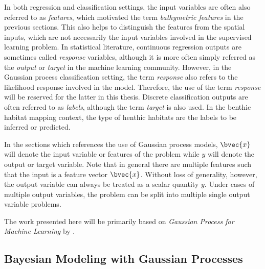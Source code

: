 		In both regression and classification settings, the input variables are often also referred to as \textit{features}, which motivated the term \textit{bathymetric features} in the previous sections. This also helps to distinguish the features from the spatial inputs, which are not necessarily the input variables involved in the supervised learning problem. In statistical literature, continuous regression outputs are sometimes called \textit{response} variables, although it is more often simply referred as the \textit{output} or \textit{target} in the machine learning community. However, in the Gaussian process classification setting, the term \textit{response} also refers to the likelihood response involved in the model. Therefore, the use of the term \textit{response} will be reserved for the latter in this thesis. Discrete classification outputs are often referred to as \textit{labels}, although the term \textit{target} is also used. In the benthic habitat mapping context, the type of henthic habitats are the labels to be inferred or predicted. 
		
		In the sections which references the use of Gaussian process models, $\bvec{x}$ will denote the input variable or features of the problem while $y$ will denote the output or target variable. Note that in general there are multiple features such that the input is a feature vector $\bvec{x}$. Without loss of generality, however, the output variable can always be treated as a scalar quantity $y$. Under cases of multiple output variables, the problem can be split into multiple single output variable problems.
		
		

		The work presented here will be primarily based on \textit{Gaussian Process for Machine Learning} by \cite{GaussianProcessForMachineLearning}. 

		\subsection{Bayesian Modeling with Gaussian Processes}
		

